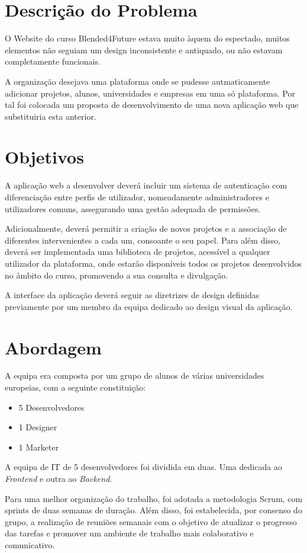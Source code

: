\section{Descrição do Problema}
\label{sec:introducao_descproblema}

O Website do curso Blended4Future estava muito àquem do espectado, muitos elementos não seguiam um design inconsistente e antiquado, ou não estavam completamente funcionais. 

A organização desejava uma plataforma onde se pudesse autmaticamente adicionar projetos, alunos, universidades e empresas em uma só plataforma. Por tal foi colocada um proposta de desenvolvimento de uma nova aplicação web que substituiria esta anterior. 



\section{Objetivos}

A aplicação web a desenvolver deverá incluir um sistema de autenticação com diferenciação entre perfis de utilizador, nomeadamente administradores e utilizadores comuns, assegurando uma gestão adequada de permissões. 

Adicionalmente, deverá permitir a criação de novos projetos e a associação de diferentes intervenientes a cada um, consoante o seu papel. Para além disso, deverá ser implementada uma biblioteca de projetos, acessível a qualquer utilizador da plataforma, onde estarão disponíveis todos os projetos desenvolvidos no âmbito do curso, promovendo a sua consulta e divulgação.

A interface da aplicação deverá seguir as diretrizes de design definidas previamente por um membro da equipa dedicado ao design visual da aplicação.


\section{Abordagem}

A equipa era composta por um grupo de alunos de várias universidades europeias, com a seguinte constituição:

\begin{itemize}
\item 5 Desenvolvedores
\item 1 Designer
\item 1 Marketer
\end{itemize}

A equipa de IT de 5 desenvolvedores foi dividida em duas. Uma dedicada ao \textit{Frontend} e outra ao \textit{Backend}.

Para uma melhor organização do trabalho, foi adotada a metodologia Scrum, com sprints de duas semanas de duração. Além disso, foi estabelecida, por consenso do grupo, a realização de reuniões semanais com o objetivo de atualizar o progresso das tarefas e promover um ambiente de trabalho mais colaborativo e comunicativo.